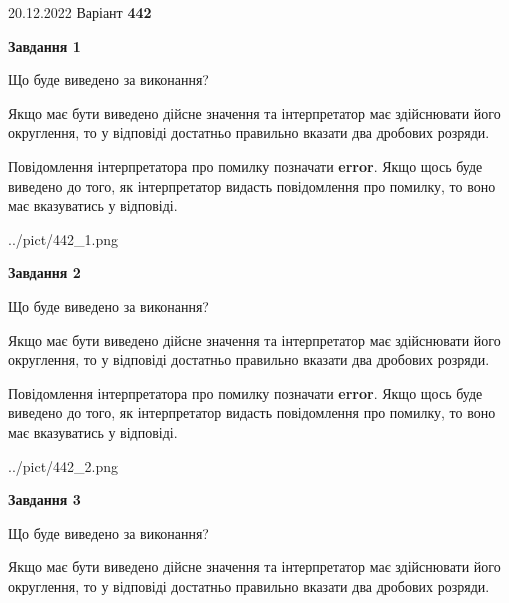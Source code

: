 \documentclass[12pt, ukrainian]{article}
\begin{document}
{20.12.2022 Варіант \No \textbf { 442 }\par}
{
\begin {Large}

{\begin {center}\textbf{Завдання 1}\end {center}}\par
Що буде виведено за виконання? \par

Якщо має бути виведено дійсне значення та інтерпретатор має здійснювати його округлення, 
то у відповіді достатньо правильно вказати два дробових розряди.

Повідомлення інтерпретатора про помилку позначати \textbf{error}.
Якщо щось буде виведено до того, як інтерпретатор видасть повідомлення про помилку, 
то воно має вказуватись у відповіді. \par

\begin{center}
	{../pict/442_1.png}
\end{center}
\newpage

{\begin {center}\textbf{Завдання 2}\end {center}}\par
Що буде виведено за виконання? \par

Якщо має бути виведено дійсне значення та інтерпретатор має здійснювати його округлення, 
то у відповіді достатньо правильно вказати два дробових розряди.

Повідомлення інтерпретатора про помилку позначати \textbf{error}.
Якщо щось буде виведено до того, як інтерпретатор видасть повідомлення про помилку, 
то воно має вказуватись у відповіді. \par

\begin{center}
	{../pict/442_2.png}
\end{center}
\newpage

{\begin {center}\textbf{Завдання 3}\end {center}}\par
Що буде виведено за виконання? \par

Якщо має бути виведено дійсне значення та інтерпретатор має здійснювати його округлення, 
то у відповіді достатньо правильно вказати два дробових розряди.


\end{Large}}
\end{document}
